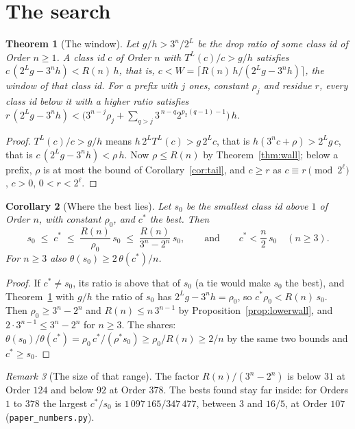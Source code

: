 \documentclass[10pt,a4paper,titlepage]{article}
\makeatletter
\newcommand{\termhere}[1]{\leavevmode
  \Hy@raisedlink{\hyper@anchorstart{term:#1}\hyper@anchorend}}
\theoremstyle{plain}
\newtheorem{theorem}{Theorem}[section]
\newtheorem{corollary}[theorem]{Corollary}
\theoremstyle{definition}
\theoremstyle{remark}
\newtheorem{remark}[theorem]{Remark}
\makeatother
\begin{document}
\section{The search}
\label{sec:search}

\begin{theorem}[The window]
\label{thm:window}
\termhere{window}Let $g/h > 3^n/2^L$ be the drop ratio of some class id of Order $n \ge 1$. A class id $c$ of Order $n$ with
$T^L(c)/c > g/h$ satisfies $c\,(2^L g - 3^n h) < R(n)\,h$, that is, $c < W = \lceil R(n)\,h/(2^L g - 3^n h) \rceil$, the window of that class id. For a prefix with $j$ ones, constant $\rho_j$ and
residue $r$, every class id below it with a higher ratio satisfies
$r\,(2^L g - 3^n h) < \bigl(3^{n-j}\rho_j + \sum_{q>j} 3^{\,n-q} 2^{p_2(q-1)-1}\bigr)\,h$.
\end{theorem}
\begin{proof}
$T^L(c)/c > g/h$ means $h\,2^L T^L(c) > g\,2^L c$, that is $h(3^n c + \rho) > 2^L g\,c$, that is
$c\,(2^L g - 3^n h) < \rho\,h$. Now $\rho \le R(n)$ by Theorem~\ref{thm:wall}; below a prefix,
$\rho$ is at most the bound of Corollary~\ref{cor:tail}, and $c \ge r$ as $c \equiv r \pmod{2^\ell}$,
$c > 0$, $0 < r < 2^\ell$.
\end{proof}

\begin{corollary}[Where the best lies]
\label{cor:bestrange}
Let $s_0$ be the smallest class id above $1$ of Order $n$, with constant $\rho_0$, and $c^\ast$ the best. Then
\[
s_0 \;\le\; c^\ast \;\le\; \frac{R(n)}{\rho_0}\,s_0 \;\le\; \frac{R(n)}{3^n - 2^n}\,s_0 ,
\qquad\text{and}\qquad c^\ast < \frac{n}{2}\,s_0 \quad (n \ge 3).
\]
For $n \ge 3$ also $\theta(s_0) \ge 2\,\theta(c^\ast)/n$.
\end{corollary}
\begin{proof}
If $c^\ast \ne s_0$, its ratio is above that of $s_0$ (a tie would make $s_0$ the best), and
Theorem~\ref{thm:window} with $g/h$ the ratio of $s_0$ has $2^L g - 3^n h = \rho_0$, so
$c^\ast \rho_0 < R(n)\,s_0$. Then $\rho_0 \ge 3^n - 2^n$ and $R(n) \le n\,3^{n-1}$ by
Proposition~\ref{prop:lowerwall}, and $2\cdot 3^{n-1} \le 3^n - 2^n$ for $n \ge 3$. The shares:
$\theta(s_0)/\theta(c^\ast) = \rho_0\,c^\ast/(\rho^\ast s_0) \ge \rho_0/R(n) \ge 2/n$ by the same two bounds and $c^\ast \ge s_0$.
\end{proof}

\begin{remark}[The size of that range]
\label{rem:bestrange}
The factor $R(n)/(3^n - 2^n)$ is below $31$ at Order $124$ and below $92$ at Order $378$. The bests
found stay far inside: for Orders $1$ to $378$ the largest $c^\ast/s_0$ is $1\,097\,165/347\,477$, between
$3$ and $16/5$, at Order $107$ (\texttt{paper\_numbers.py}).
\end{remark}
\end{document}
